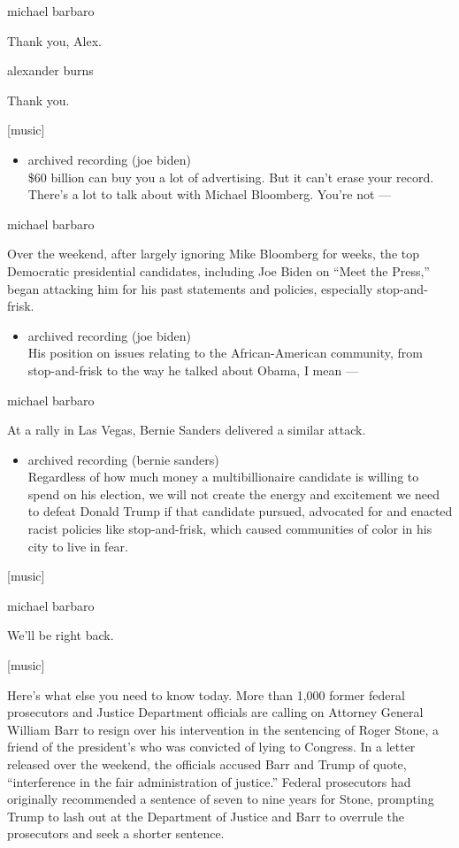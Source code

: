 michael barbaro

Thank you, Alex.

alexander burns

Thank you.

{[}music{]}

\begin{itemize}
\tightlist
\item
  archived recording (joe biden)\\
  \$60 billion can buy you a lot of advertising. But it can't erase your
  record. There's a lot to talk about with Michael Bloomberg. You're not
  ---
\end{itemize}

michael barbaro

Over the weekend, after largely ignoring Mike Bloomberg for weeks, the
top Democratic presidential candidates, including Joe Biden on ``Meet
the Press,'' began attacking him for his past statements and policies,
especially stop-and-frisk.

\begin{itemize}
\tightlist
\item
  archived recording (joe biden)\\
  His position on issues relating to the African-American community,
  from stop-and-frisk to the way he talked about Obama, I mean ---
\end{itemize}

michael barbaro

At a rally in Las Vegas, Bernie Sanders delivered a similar attack.

\begin{itemize}
\tightlist
\item
  archived recording (bernie sanders)\\
  Regardless of how much money a multibillionaire candidate is willing
  to spend on his election, we will not create the energy and excitement
  we need to defeat Donald Trump if that candidate pursued, advocated
  for and enacted racist policies like stop-and-frisk, which caused
  communities of color in his city to live in fear.
\end{itemize}

{[}music{]}

michael barbaro

We'll be right back.

{[}music{]}

Here's what else you need to know today. More than 1,000 former federal
prosecutors and Justice Department officials are calling on Attorney
General William Barr to resign over his intervention in the sentencing
of Roger Stone, a friend of the president's who was convicted of lying
to Congress. In a letter released over the weekend, the officials
accused Barr and Trump of quote, ``interference in the fair
administration of justice.'' Federal prosecutors had originally
recommended a sentence of seven to nine years for Stone, prompting Trump
to lash out at the Department of Justice and Barr to overrule the
prosecutors and seek a shorter sentence.

